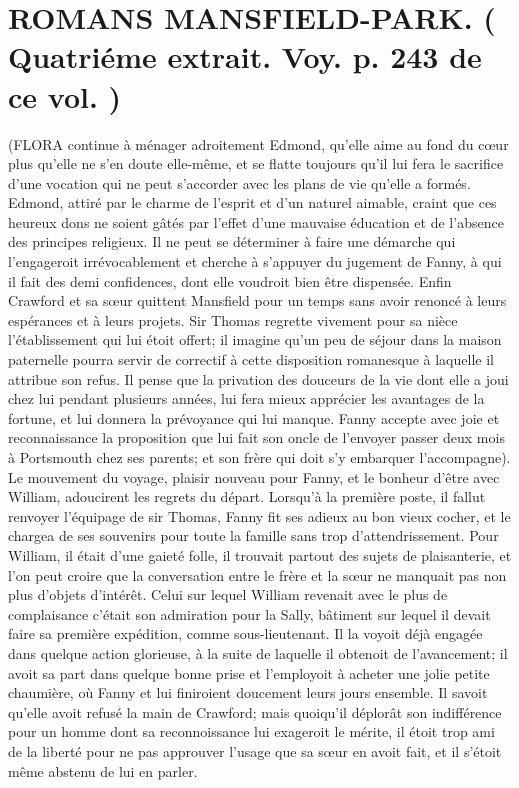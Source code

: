 \setcounter{page}{379}
\section{ROMANS \large{MANSFIELD-PARK.} \small{( Quatriéme extrait. Voy. p. 243 de ce vol. )}}
(FLORA continue à ménager adroitement Edmond, qu’elle aime au fond du cœur plus qu’elle ne s’en doute elle-même, et se flatte toujours qu’il lui fera le sacrifice d’une vocation qui ne peut s’accorder avec les plans de vie qu’elle a formés. Edmond, attiré par le charme de l’esprit et d’un naturel aimable, craint que ces heureux dons ne soient gâtés par l’effet d’une mauvaise éducation et de l’absence des principes religieux.
Il ne peut se déterminer à faire une démarche qui l’engageroit irrévocablement et cherche à s’appuyer du jugement de Fanny, à qui il fait des demi confidences, dont elle voudroit bien être dispensée. Enfin Crawford et sa sœur quittent Mansfield pour un temps sans avoir renoncé à leurs espérances et à leurs projets.
Sir Thomas regrette vivement pour sa nièce l’établissement qui lui étoit offert; il\setcounter{page}{380} imagine qu'un peu de séjour dans la maison paternelle pourra servir de correctif à cette disposition romanesque à laquelle il attribue son refus. Il pense que la privation des douceurs de la vie dont elle a joui chez lui pendant plusieurs années, lui fera mieux apprécier les avantages de la fortune, et lui donnera la prévoyance qui lui manque.
Fanny accepte avec joie et reconnaissance la proposition que lui fait son oncle de l'envoyer passer deux mois à Portsmouth chez ses parents; et son frère qui doit s'y embarquer l'accompagne).
Le mouvement du voyage, plaisir nouveau pour Fanny, et le bonheur d'être avec William, adoucirent les regrets du départ. Lorsqu'à la première poste, il fallut renvoyer l'équipage de sir Thomas, Fanny fit ses adieux au bon vieux cocher, et le chargea de ses souvenirs pour toute la famille sans trop d'attendrissement.
Pour William, il était d'une gaieté folle, il trouvait partout des sujets de plaisanterie, et l'on peut croire que la conversation entre le frère et la sœur ne manquait pas non plus d'objets d'intérêt. Celui sur lequel William revenait avec le plus de complaisance c'était son admiration pour la Sally, bâtiment sur lequel il devait faire sa première\setcounter{page}{381} expédition, comme sous-lieutenant. Il la voyoit déjà engagée dans quelque action glorieuse, à la suite de laquelle il obtenoit de l'avancement; il avoit sa part dans quelque bonne prise et l'employoit à acheter une jolie petite chaumière, où Fanny et lui finiroient doucement leurs jours ensemble. Il savoit qu'elle avoit refusé la main de Crawford; mais quoiqu'il déplorât son indifférence pour un homme dont sa reconnoissance lui exageroit le mérite, il étoit trop ami de la liberté pour ne pas approuver l'usage que sa sœur en avoit fait, et il s'étoit même abstenu de lui en parler.
